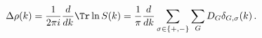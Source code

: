 \begin{equation}
\Delta\rho(k) = \frac{1}{2\pi i}\frac{d}{dk}\Tr \ln S(k) 
= \frac{1}{\pi}\frac{d}{dk}\sum_{\sigma\in\{+,-\}}
\sum_G D_G\delta_{G,\sigma}(k) \, .
\end{equation}

